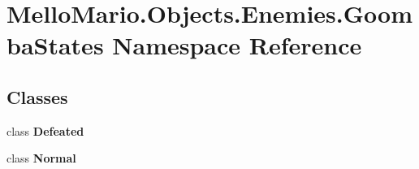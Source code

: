 \section{Mello\+Mario.\+Objects.\+Enemies.\+Goomba\+States Namespace Reference}
\label{namespaceMelloMario_1_1Objects_1_1Enemies_1_1GoombaStates}
\subsection*{Classes}
\begin{DoxyCompactItemize}
\item 
class \textbf{ Defeated}
\item 
class \textbf{ Normal}
\end{DoxyCompactItemize}

